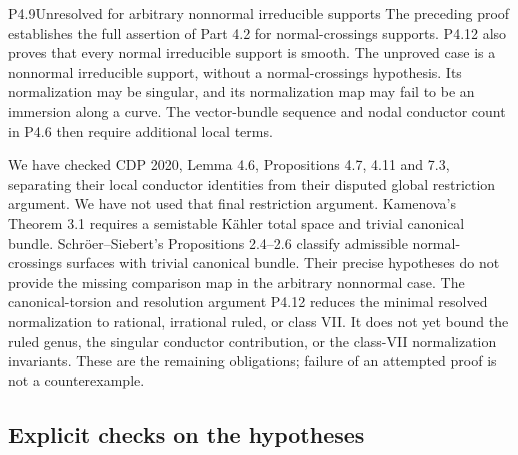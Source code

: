 \begin{statement}{P4.9}{Unresolved for arbitrary nonnormal irreducible supports}
The preceding proof establishes the full assertion of Part 4.2 for
normal-crossings supports. P4.12 also proves that every normal
irreducible support is smooth. The unproved case is a nonnormal
irreducible support, without a normal-crossings hypothesis. Its
normalization may be singular, and its normalization map may fail
to be an immersion along a curve. The vector-bundle sequence and
nodal conductor count in P4.6 then require additional local terms.
\end{statement}
We have checked CDP 2020, Lemma 4.6, Propositions 4.7, 4.11 and
7.3, separating their local conductor identities from their disputed
global restriction argument. We have not used that final restriction
argument. Kamenova's Theorem 3.1 requires a semistable Kähler total
space and trivial canonical bundle. Schröer--Siebert's Propositions
2.4--2.6 classify admissible normal-crossings surfaces with trivial
canonical bundle. Their precise hypotheses do not provide the missing
comparison map in the arbitrary nonnormal case. The canonical-torsion
and resolution argument P4.12 reduces the minimal resolved
normalization to rational, irrational ruled, or class VII. It does
not yet bound the ruled genus, the singular conductor contribution,
or the class-VII normalization invariants. These are the remaining
obligations; failure of an attempted proof is not a counterexample.

\subsection{Explicit checks on the hypotheses}

